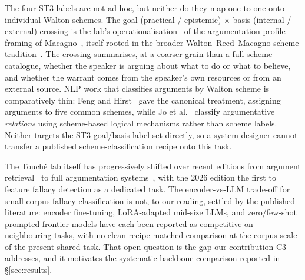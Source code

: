 The four ST3 labels are not ad hoc, but neither do they map one-to-one onto individual Walton schemes. The goal (practical / epistemic) $\times$ basis (internal / external) crossing is the lab's operationalisation~\cite{kiesel:2026c} of the argumentation-profile framing of Macagno~\cite{macagno2022argumentation}, itself rooted in the broader Walton--Reed--Macagno scheme tradition~\cite{walton2008schemes}. The crossing summarises, at a coarser grain than a full scheme catalogue, whether the speaker is arguing about what to do or what to believe, and whether the warrant comes from the speaker's own resources or from an external source. NLP work that classifies arguments by Walton scheme is comparatively thin: Feng and Hirst~\cite{feng2011scheme} gave the canonical treatment, assigning arguments to five common schemes, while Jo et al.~\cite{jo2021schemes} classify argumentative \emph{relations} using scheme-based logical mechanisms rather than scheme labels. Neither targets the ST3 goal/basis label set directly, so a system designer cannot transfer a published scheme-classification recipe onto this task.

The Touch\'{e} lab itself has progressively shifted over recent editions from argument retrieval~\cite{bondarenko2022touche,bondarenko2023touche} to full argumentation systems~\cite{kiesel2024touche,kiesel2025touche}, with the 2026 edition the first to feature fallacy detection as a dedicated task. The encoder-vs-LLM trade-off for small-corpus fallacy classification is not, to our reading, settled by the published literature: encoder fine-tuning, LoRA-adapted mid-size LLMs, and zero/few-shot prompted frontier models have each been reported as competitive on neighbouring tasks, with no clean recipe-matched comparison at the corpus scale of the present shared task. That open question is the gap our contribution C3 addresses, and it motivates the systematic backbone comparison reported in \S\ref{sec:results}.
